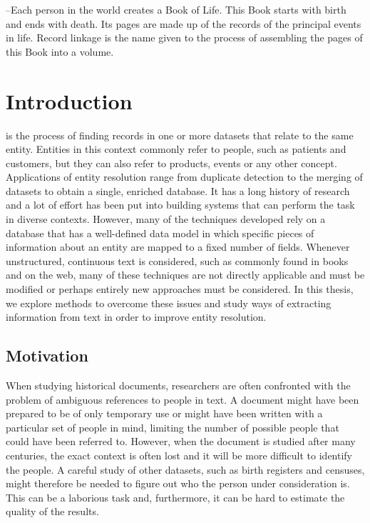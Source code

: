 \begin{savequote}[75mm] 
--Each person in the world creates a Book of Life. This Book starts with birth and ends with death. Its pages are made up of the records of the principal events in life. Record linkage is the name given to the process of assembling the pages of this Book into a volume.
\end{savequote}




\chapter{Introduction}
\label{ch:introduction}

 is the process of finding records in one or more datasets that relate to the same entity.
Entities in this context commonly refer to people, such as patients and customers, but they can also refer to products, events or any other concept.
Applications of entity resolution range from duplicate detection to the merging of datasets to obtain a single, enriched database.
It has a long history of research and a lot of effort has been put into building systems that can perform the task in diverse contexts.
However, many of the techniques developed rely on a database that has a well-defined data model in which specific pieces of information about an entity are mapped to a fixed number of fields.
Whenever unstructured, continuous text is considered, such as commonly found in books and on the web, many of these techniques are not directly applicable and must be modified or perhaps entirely new approaches must be considered.
In this thesis, we explore methods to overcome these issues and study ways of extracting information from text in order to improve entity resolution.




\section{Motivation}
\label{sec:motivation}

When studying historical documents, researchers are often confronted with the problem of ambiguous references to people in text.
A document might have been prepared to be of only temporary use or might have been written with a particular set of people in mind, limiting the number of possible people that could have been referred to.
However, when the document is studied after many centuries, the exact context is often lost and it will be more difficult to identify the people.
A careful study of other datasets, such as birth registers and censuses, might therefore be needed to figure out who the person under consideration is.
This can be a laborious task and, furthermore, it can be hard to estimate the quality of the results.

